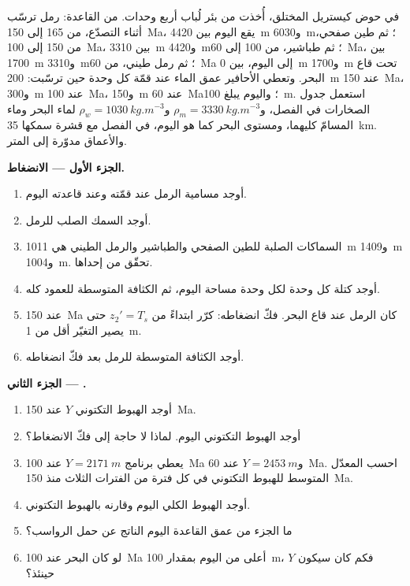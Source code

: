 \begin{problem}\label{pb:b2:basins-compared:1}
في حوض كيستريل المختلق، أُخذت من بئر لُباب أربع وحدات. من القاعدة: رمل ترسّب أثناء
التصدّع، من 165 إلى \qty{150}{Ma}، يقع اليوم بين \qty{4420}{m} و\qty{6030}{m}؛ ثم طين صفحي، من 150
إلى \qty{100}{Ma}، بين \qty{3310}{m} و\qty{4420}{m}؛ ثم طباشير، من 100 إلى \qty{60}{Ma}، بين
\qty{1700}{m} و\qty{3310}{m}؛ ثم رمل طيني، من \qty{60}{Ma} إلى اليوم، بين \qty{0}{m}
و\qty{1700}{m} تحت قاع البحر. وتعطي الأحافير عمق الماء عند قمّة كل وحدة حين
ترسّبت: \qty{200}{m} عند \qty{150}{Ma}، و\qty{300}{m} عند \qty{100}{Ma}، و\qty{150}{m} عند
\qty{60}{Ma}؛ واليوم يبلغ \qty{100}{m}. استعمل جدول الصخارات في الفصل، و$\rho_m =
\qty{3330}{kg.m^{-3}}$ و$\rho_w = \qty{1030}{kg.m^{-3}}$ لماء البحر وماء المسامّ كليهما، ومستوى البحر
كما هو اليوم،  في الفصل مع قشرة سمكها \qty{35}{km}. والأعماق مدوّرة إلى
المتر.

\noindent\textbf{الجزء الأول --- الانضغاط.}
\begin{enumerate}
  \item أوجد مسامية الرمل عند قمّته وعند قاعدته اليوم.
  \item أوجد السمك الصلب للرمل.
  \item السماكات الصلبة للطين الصفحي والطباشير والرمل الطيني هي \qty{1011}{m}
        و\qty{1409}{m} و\qty{1004}{m}. تحقّق من إحداها.
  \item أوجد كتلة كل وحدة لكل وحدة مساحة اليوم، ثم الكثافة المتوسطة للعمود
        كله.
  \item عند \qty{150}{Ma} كان الرمل عند قاع البحر. فكّ انضغاطه: كرّر ابتداءً من $z_2' =
        T_s$ حتى يصير التغيّر أقل من \qty{1}{m}.
  \item أوجد الكثافة المتوسطة للرمل بعد فكّ انضغاطه.
\end{enumerate}

\noindent\textbf{الجزء الثاني --- .}
\begin{enumerate}[resume]
  \item أوجد الهبوط التكتوني $Y$ عند \qty{150}{Ma}.
  \item أوجد الهبوط التكتوني اليوم. لماذا لا حاجة إلى فكّ الانضغاط؟
  \item يعطي برنامج $Y = \qty{2171}{m}$ عند \qty{100}{Ma} و$Y = \qty{2453}{m}$ عند
        \qty{60}{Ma}. احسب المعدّل المتوسط للهبوط التكتوني في كل فترة من الفترات
        الثلاث منذ \qty{150}{Ma}.
  \item أوجد الهبوط الكلي اليوم وقارنه بالهبوط التكتوني.
  \item ما الجزء من عمق القاعدة اليوم الناتج عن حمل الرواسب؟
  \item لو كان البحر عند \qty{100}{Ma} أعلى من اليوم بمقدار \qty{100}{m}، فكم كان سيكون $Y$
        حينئذ؟
\end{enumerate}


\end{problem}
